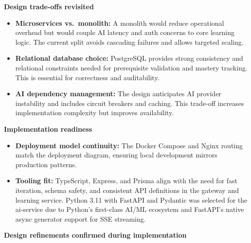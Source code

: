 \textbf{Design trade-offs revisited}

\begin{itemize}
    \item \textbf{Microservices vs.\ monolith:} A monolith would reduce operational overhead but would couple AI latency and auth concerns to core learning logic. The current split avoids cascading failures and allows targeted scaling.
    \item \textbf{Relational database choice:} PostgreSQL provides strong consistency and relational constraints needed for prerequisite validation and mastery tracking. This is essential for correctness and auditability.
    \item \textbf{AI dependency management:} The design anticipates AI provider instability and includes circuit breakers and caching. This trade-off increases implementation complexity but improves availability.
\end{itemize}

\textbf{Implementation readiness}

\begin{itemize}
    \item \textbf{Deployment model continuity:} The Docker Compose and Nginx routing match the deployment diagram, ensuring local development mirrors production patterns.
    \item \textbf{Tooling fit:} TypeScript, Express, and Prisma align with the need for fast iteration, schema safety, and consistent API definitions in the gateway and learning service. Python 3.11 with FastAPI and Pydantic was selected for the ai-service due to Python's first-class AI/ML ecosystem and FastAPI's native async generator support for SSE streaming.
\end{itemize}

\textbf{Design refinements confirmed during implementation}


